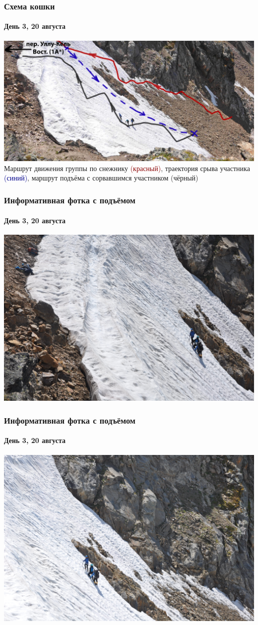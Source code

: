 \begin{frame}
	\frametitle{Схема кошки}
	\framesubtitle{День 3, 20 августа}
	\centering
	\includegraphics[width=\textwidth]{../pics/DSC_0946}			
	Маршрут движения группы по снежнику \textcolor{darkred}{(красный)}, траектория срыва участника \textcolor{darkblue}{(синий)}, маршрут подъёма с сорвавшимся участником (чёрный)
\end{frame}

\begin{frame}
	\frametitle{Информативная фотка с подъёмом}
	\framesubtitle{День 3, 20 августа}
	\centering
	\includegraphics[width=\textwidth]{../pics/DSC_0968}			
\end{frame}

\begin{frame}
	\frametitle{Информативная фотка с подъёмом}
	\framesubtitle{День 3, 20 августа}
	\centering
	\includegraphics[width=\textwidth]{../pics/DSC_0969}			
\end{frame}